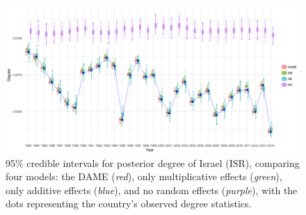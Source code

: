 \documentclass[a4paper]{article}
\begin{document}
 \begin{figure}[ht]
 	\begin{center}
 		\includegraphics[width=1\textwidth]{plots_paper/ISR79.png}	
 	\end{center}
 	\caption {95\% credible intervals for posterior degree of Israel (ISR), comparing four models: the DAME (\textit{red}), only multiplicative effects (\textit{green}), only additive effects (\textit{blue}), and no random effects (\textit{purple}), with the dots representing the country's observed degree statistics.}
 	\label{figure:modelvalidation}
 \end{figure}
\end{document}
